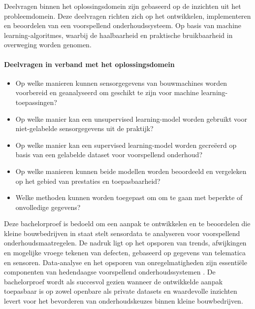 Deelvragen binnen het oplossingsdomein zijn gebaseerd op de inzichten uit het probleemdomein. Deze deelvragen richten zich op het ontwikkelen, implementeren en beoordelen van een voorspellend onderhoudssysteem. Op basis van machine learning-algoritmes, waarbij de haalbaarheid en praktische bruikbaarheid in overweging worden genomen.

\paragraph{Deelvragen in verband met het oplossingsdomein}

\begin{itemize}
    \item Op welke manieren kunnen sensorgegevens van bouwmachines worden voorbereid en geanalyseerd om geschikt te zijn voor machine learning-toepassingen?
    
    \item Op welke manier kan een unsupervised learn\-in\-g-model worden gebruikt voor niet-gelabel\-de sensorgegevens uit de praktijk?
    
    \item Op welke manier kan een supervised learnin\-g-model worden gecreëerd op basis van een gelabelde dataset voor voorspellend onderhoud?
    
    \item Op welke manieren kunnen beide modellen worden beoordeeld en vergeleken op het gebied van prestaties en toepasbaarheid?
    
    \item Welke methoden kunnen worden toegepast om om te gaan met beperkte of onvolledige gegevens?
\end{itemize}

Deze bachelorproef is bedoeld om een aanpak te ontwikkelen en te beoordelen die kleine bouwbedrijven in staat stelt sensordata te analyseren voor voorspellend onderhoudsmaatregelen. De nadruk ligt op het opsporen van trends, afwijkingen en mogelijke vroege tekenen van defecten, gebaseerd op gegevens van telematica en sensoren. Data-analyse en het opsporen van onregelmatigheden zijn essentiële componenten van hedendaagse voorspellend onderhoudssystemen \autocite{Carvalho2019, Elahi2023}. De bachelorproef wordt als succesvol gezien wanneer de ontwikkelde aanpak toepasbaar is op zowel openbare als private datasets en waardevolle inzichten levert voor het bevorderen van onderhoudskeuzes binnen kleine bouwbedrijven.


